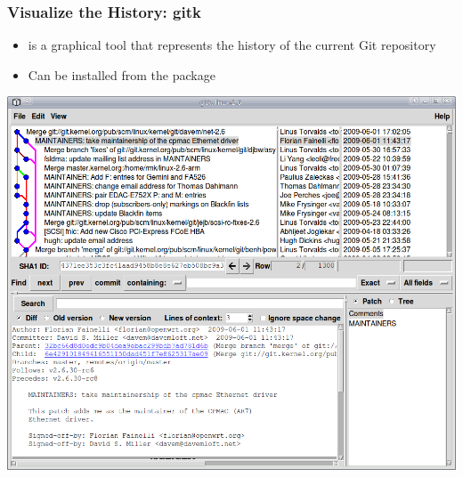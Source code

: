 \begin{frame}
  \frametitle{Visualize the History: gitk}
  \begin{itemize}
  \item {} is a graphical tool that represents the history of
    the current Git repository
  \item Can be installed from the  package
  \end{itemize}
  \begin{center}
    \includegraphics[height=0.65\textheight]{slides/kernel-git-content/gitk.png}
  \end{center}
\end{frame}

